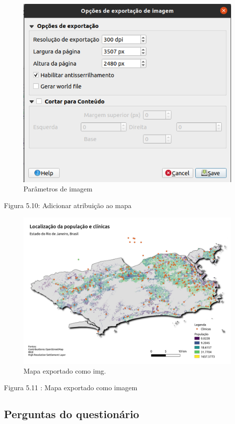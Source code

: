 \documentclass[
  portuguese,
]{krantz}
\begin{document}
\begin{figure}
\centering
\includegraphics{media/modulo5/img-parameters.png}
\caption{Parâmetros de imagem}
\end{figure}

Figura 5.10: Adicionar atribuição ao mapa

\begin{figure}
\centering
\includegraphics{media/modulo5/exported-map.png}
\caption{Mapa exportado como img.}
\end{figure}

Figura 5.11 : Mapa exportado como imagem

\hypertarget{perguntas-do-questionuxe1rio-10}{%
\subsection{\texorpdfstring{\textbf{Perguntas do questionário}}{Perguntas do questionário}}\label{perguntas-do-questionuxe1rio-10}}
\end{document}
